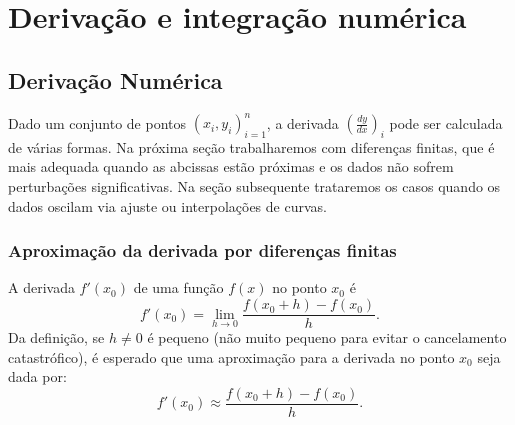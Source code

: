 
%

\chapter{Derivação e integração numérica}

\section{Derivação Numérica}

Dado um conjunto de pontos $(x_i,y_i)_{i=1}^n$, a derivada $\left(\frac{dy}{dx}\right)_i$ pode ser calculada de várias formas. Na próxima seção trabalharemos com diferenças finitas, que é mais adequada quando as abcissas estão próximas e os dados não sofrem perturbações significativas. Na seção subsequente trataremos os casos quando os dados oscilam via ajuste ou interpolações de curvas.

\subsection{Aproximação da derivada por diferenças finitas}

A derivada $f'(x_0)$ de uma função $f(x)$ no ponto $x_0$ é
\begin{equation*}
  f'(x_0)=\lim_{h\to 0}\frac{f(x_0+h)-f(x_0)}{h}.  
\end{equation*}
Da definição, se $h\neq 0$ é pequeno (não muito pequeno para evitar o cancelamento catastrófico), é esperado que uma aproximação para a derivada no ponto $x_0$ seja dada por:
\begin{equation}\label{eq:dp}
  f'(x_0)\approx \frac{f(x_0+h)-f(x_0)}{h}.  
\end{equation}


